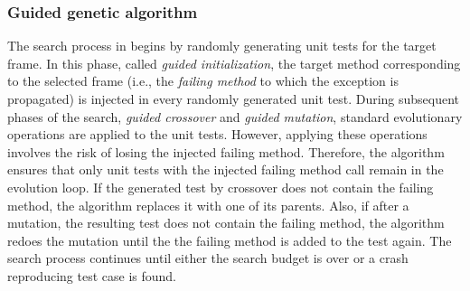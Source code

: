 \subsubsection{Guided genetic algorithm}
\label{sec:background:evocrash:guidedalg}
The search process in \evocrash begins by randomly generating unit tests for the target frame.
In this phase, called \emph{guided initialization}, the target method corresponding to the selected frame (i.e., the \emph{failing method} to which the exception is propagated) is injected in every randomly generated unit test.
During subsequent phases of the search, \emph{guided crossover} and \emph{guided mutation}, standard evolutionary operations are applied to the unit tests.
However, applying these operations involves the risk of losing the injected failing method.
Therefore, the algorithm ensures that only unit tests with the injected failing method call remain in the evolution loop. 
If the generated test by crossover does not contain the failing method, the algorithm replaces it with one of its parents. 
Also, if after a mutation, the resulting test does not contain the failing method, the algorithm redoes the mutation until the the failing method is added to the test again.
The search process continues until either the search budget is over or a crash reproducing test case is found.

